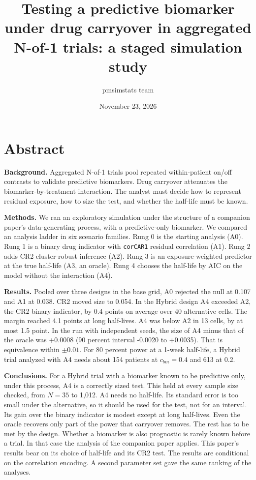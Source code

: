 \documentclass[
  11pt,
]{article}
\title{Testing a predictive biomarker under drug carryover in aggregated N-of-1 trials: a staged simulation study}
\author{pmsimstats team}
\date{November 23, 2026}
\begin{document}
\maketitle

{
\setcounter{tocdepth}{2}
\tableofcontents
}
\listoffigures
\listoftables
{}
\section*{Abstract}\label{abstract}

\textbf{Background.} Aggregated N-of-1 trials pool repeated within-patient
on/off contrasts to validate predictive biomarkers. Drug carryover
attenuates the biomarker-by-treatment interaction. The analyst must
decide how to represent residual exposure, how to size the test, and
whether the half-life must be known.

\textbf{Methods.} We ran an exploratory simulation under the structure of
a companion paper's data-generating process, with a predictive-only
biomarker. We compared an analysis ladder in six scenario families.
Rung 0 is the starting analysis (A0). Rung 1 is a binary drug
indicator with \texttt{corCAR1} residual correlation (A1). Rung 2 adds CR2
cluster-robust inference (A2). Rung 3 is an exposure-weighted
predictor at the true half-life (A3, an oracle). Rung 4 chooses the
half-life by AIC on the model without the interaction (A4).

\textbf{Results.} Pooled over three designs in the base grid, A0 rejected
the null at 0.107 and A1 at
0.038. CR2 moved size to 0.054.
In the Hybrid design A4 exceeded A2, the CR2 binary indicator, by
0.4 points on average over
40 alternative cells. The margin reached
4.1 points at long half-lives. A4 was
below A2 in 13 cells, by at most
1.5 point. In the run with independent
seeds, the size of A4 minus that of the oracle was
+0.0008 (90 percent interval
-0.0020 to +0.0035).
That is equivalence within \(\pm 0.01\). For 80 percent power at a 1-week
half-life, a Hybrid trial analyzed with A4 needs about
154 patients at
\(c_{bm} = 0.4\) and 613 at
0.2.

\textbf{Conclusions.} For a Hybrid trial with a biomarker known to be
predictive only, under this process, A4 is a correctly sized test.
This held at every sample size checked, from \(N = 35\) to
1,012. A4
needs no half-life. Its standard error is too small under the alternative, so
it should be used for the test, not for an interval. Its gain
over the binary indicator is modest except at long half-lives. Even
the oracle recovers only part of the power that carryover removes.
The rest has to be met by the design. Whether a biomarker is also
prognostic is rarely known before a trial. In that case the analysis of the
companion paper applies.
This paper's results bear on its choice of half-life and its CR2
test. The results are conditional on the correlation encoding. A
second parameter set gave the same ranking of the analyses.
\end{document}
